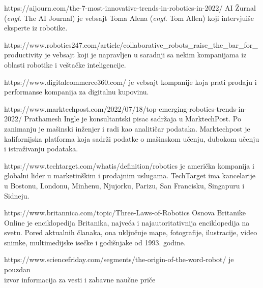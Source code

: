 \documentclass{article}
\begin{document}
\pagebreak
\begin{thebibliography}{99}
	
	https://aijourn.com/the-7-most-innovative-trends-in-robotics-in-2022/
    AI Žurnal (\emph{engl.} The AI Journal) je vebsajt Toma Alena (\emph{engl.} Tom Allen) koji intervjuiše eksperte iz robotike.
	
	https://www.robotics247.com/article/collaborative\_robots\_raise\_the\_bar\_for\_productivity je vebsajt koji je napravljen u saradnji sa nekim kompanijama iz oblasti robotike i veštačke inteligencije.
	
	https://www.digitalcommerce360.com/ je vebsajt kompanije koja prati prodaju i performanse kompanija za digitalnu kupovinu.
	
	https://www.marktechpost.com/2022/07/18/top-emerging-robotics-trends-in-2022/ Prathamesh Ingle je konsultantski pisac sadržaja u MarktechPost. Po zanimanju je mašinski inženjer i radi kao analitičar podataka. Marktechpost je kalifornijska platforma koja sadrži podatke o mašinskom učenju, dubokom učenju i istraživanju podataka.
 
	https://www.techtarget.com/whatis/definition/robotics  je američka kompanija i globalni lider u marketinškim i prodajnim uslugama. TechTarget ima kancelarije u Bostonu, Londonu, Minhenu, Njujorku, Parizu, San Francisku, Singapuru i Sidneju.
 
	https://www.britannica.com/topic/Three-Laws-of-Robotics Osnova Britanike Online je enciklopedija Britanika, najveća i najautoritativnija enciklopedija na svetu. Pored aktualnih članaka, ona uključuje mape, fotografije, ilustracije, video snimke, multimedijske isečke i godišnjake od 1993. godine.

 https://www.sciencefriday.com/segments/the-origin-of-the-word-robot/ je pouzdan\\ izvor informacija za vesti i zabavne naučne priče
 
	
	
	
	
\end{thebibliography}
\end{document}
